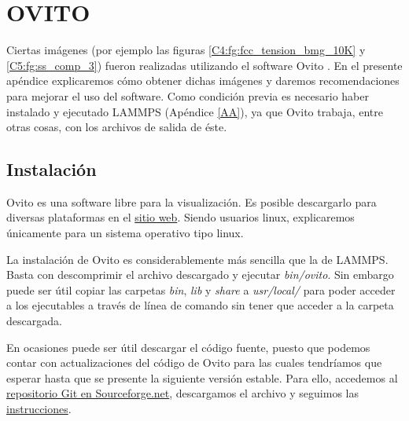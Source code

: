 
\chapter{OVITO} %

\label{AB} %


Ciertas imágenes (por ejemplo las figuras \ref{C4:fg:fcc_tension_bmg_10K} y \ref{C5:fg:ss_comp_3}) fueron realizadas utilizando el software Ovito \citep{stukowski10}. En el presente apéndice explicaremos cómo obtener dichas imágenes y daremos recomendaciones para mejorar el uso del software. Como condición previa es necesario haber instalado y ejecutado LAMMPS (Apéndice \ref{AA}), ya que Ovito trabaja, entre otras cosas, con los archivos de salida de éste.

\section{Instalación}
\label{AB_1}

Ovito es una software libre para la visualización. Es posible descargarlo para diversas plataformas en el \href{http://www.ovito.org/index.php/download}{sitio web}. Siendo usuarios linux, explicaremos únicamente para un sistema operativo tipo linux.

La instalación de Ovito es considerablemente más sencilla que la de LAMMPS. Basta con descomprimir el archivo descargado y ejecutar \textit{bin/ovito}. Sin embargo puede ser útil copiar las carpetas \textit{bin}, \textit{lib} y \textit{share} a \textit{usr/local/} para poder acceder a los ejecutables a través de línea de comando sin tener que acceder a la carpeta descargada.

En ocasiones puede ser útil descargar el código fuente, puesto que podemos contar con actualizaciones del código de Ovito para las cuales tendríamos que esperar hasta que se presente la siguiente versión estable. Para ello, accedemos al \href{http://sourceforge.net/p/ovito/git/ci/master/tree/}{repositorio Git en Sourceforge.net}, descargamos el archivo y seguimos las \href{http://www.ovito.org/manual/development.build_linux.html}{instrucciones}.

